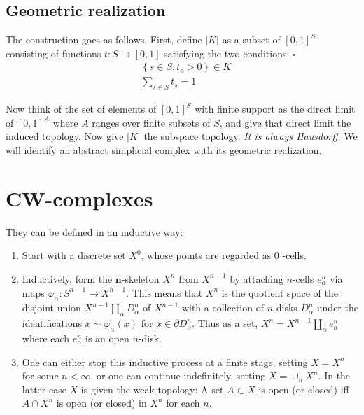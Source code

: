 \subsection*{Geometric realization}

The construction goes as follows. First, define $|K|$ as a subset of $[0,1]^S$ consisting of functions $t: S \rightarrow[0,1]$ satisfying the two conditions: $\square$
$$
\begin{aligned}
& \left\{s \in S: t_s>0\right\} \in K \\
& \sum_{s \in S} t_s=1
\end{aligned}
$$

Now think of the set of elements of $[0,1]^S$ with finite support as the direct limit of $[0,1]^A$ where $A$ ranges over finite subsets of $S$, and give that direct limit the induced topology. Now give $|K|$ the subspace topology. \textit{It is always Hausdorff}. We will identify an abstract simplicial complex with its geometric realization.









\section{CW-complexes}

They can be defined in an inductive way:

\begin{enumerate}
    \item Start with a discrete set $X^0$, whose points are regarded as 0 -cells.
    \item Inductively, form the $\boldsymbol{n}$-skeleton $X^n$ from $X^{n-1}$ by attaching $n$-cells $e_\alpha^n$ via maps $\varphi_\alpha: S^{n-1} \rightarrow X^{n-1}$. This means that $X^n$ is the quotient space of the disjoint union $X^{n-1} \amalg_\alpha D_\alpha^n$ of $X^{n-1}$ with a collection of $n$-disks $D_\alpha^n$ under the identifications $x \sim \varphi_\alpha(x)$ for $x \in \partial D_\alpha^n$. Thus as a set, $X^n=X^{n-1} \amalg_\alpha e_\alpha^n$ where each $e_\alpha^n$ is an open $n$-disk.
    \item One can either stop this inductive process at a finite stage, setting $X=X^n$ for some $n<\infty$, or one can continue indefinitely, setting $X=\cup_n X^n$. In the latter case $X$ is given the weak topology: A set $A \subset X$ is open (or closed) iff $A \cap X^n$ is open (or closed) in $X^n$ for each $n$.
    
\end{enumerate}

